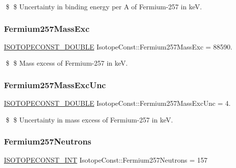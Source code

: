 \$ \$ Uncertainty in binding energy per A of Fermium-\/257 in keV. \mbox{\label{group___isotope_const-_fermium-_fm257_gac9c6fd762f987069ae37ab505f15d85b}} 
\subsubsection{\texorpdfstring{Fermium257\+Mass\+Exc}{Fermium257MassExc}}
{\footnotesize\ttfamily \mbox{\hyperlink{group___isotope_const-_macros_ga8f45a7272ce02c0b4c65c44636ed719a}{I\+S\+O\+T\+O\+P\+E\+C\+O\+N\+S\+T\+\_\+\+D\+O\+U\+B\+LE}} Isotope\+Const\+::\+Fermium257\+Mass\+Exc = 88590.}

\$ \$ Mass excess of Fermium-\/257 in keV. \mbox{\label{group___isotope_const-_fermium-_fm257_gac909f72daa29fbc82dd38dfab80b21a2}} 
\subsubsection{\texorpdfstring{Fermium257\+Mass\+Exc\+Unc}{Fermium257MassExcUnc}}
{\footnotesize\ttfamily \mbox{\hyperlink{group___isotope_const-_macros_ga8f45a7272ce02c0b4c65c44636ed719a}{I\+S\+O\+T\+O\+P\+E\+C\+O\+N\+S\+T\+\_\+\+D\+O\+U\+B\+LE}} Isotope\+Const\+::\+Fermium257\+Mass\+Exc\+Unc = 4.}

\$ \$ Uncertainty in mass excess of Fermium-\/257 in keV. \mbox{\label{group___isotope_const-_fermium-_fm257_ga2d7926424c975c7605d37ac45c46a3d3}} 
\subsubsection{\texorpdfstring{Fermium257\+Neutrons}{Fermium257Neutrons}}
{\footnotesize\ttfamily \mbox{\hyperlink{group___isotope_const-_macros_ga5f18360b3e99483a35c32d789e62621c}{I\+S\+O\+T\+O\+P\+E\+C\+O\+N\+S\+T\+\_\+\+I\+NT}} Isotope\+Const\+::\+Fermium257\+Neutrons = 157}

